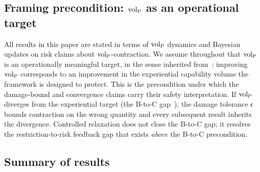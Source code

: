 \subsection{Framing precondition: ${\operatorname{vol}_{\mathrm{P}}}$ as an operational target}
\label{sec:framing_precondition}

All results in this paper are stated in terms of ${\operatorname{vol}_{\mathrm{P}}}$ dynamics
and Bayesian updates on risk claims about ${\operatorname{vol}_{\mathrm{P}}}$-contraction.  We
assume throughout that ${\operatorname{vol}_{\mathrm{P}}}$ is an operationally meaningful
target, in the sense inherited
from~\citep{lasser2026gfm,lasser2026phase}: improving ${\operatorname{vol}_{\mathrm{P}}}$
corresponds to an improvement in the experiential capability volume
the framework is designed to protect.  This is the precondition
under which the damage-bound and convergence claims carry their
safety interpretation.  If ${\operatorname{vol}_{\mathrm{P}}}$ diverges from the experiential
target (the B-to-C gap~\citep{lasser2026gfm}), the damage tolerance
$\epsilon$ bounds contraction on the wrong quantity and every
subsequent result inherits the divergence.  Controlled relaxation
does not close the B-to-C gap; it resolves the restriction-to-risk
feedback gap that exists \emph{above} the B-to-C precondition.

\subsection{Summary of results}

